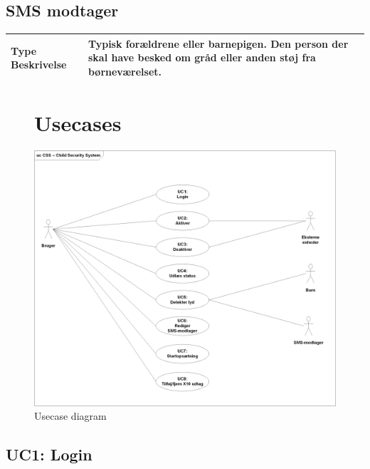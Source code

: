 \begin{table}[!htbp] \centering
\subsection{SMS modtager}
\begin{tabular}{|p{4cm}|p{8cm}|}
	\hline
\textbf{Type Beskrivelse} &
Typisk forældrene eller barnepigen. Den person der skal
have besked om gråd eller anden støj fra børneværelset.
\\\hline
	\end{tabular}
\end{table}

\begin{figure}[!htbp] \centering
\section{Usecases}
\vspace*{\fill}
\includegraphics[width=\textwidth]{billeder/Usecase_Diagram}
\caption{Usecase diagram}
\label{lab:usecasediagram}
\vspace*{\fill}
\end{figure}


\subsection{UC1: Login}



